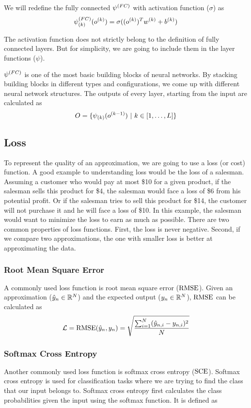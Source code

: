We will redefine the fully connected $\psi^{(FC)}$ with activation function ($\sigma$) as
$$ \psi^{(FC)}_{(k)}(o^{(k)}) = \sigma((o^{(k)})^Tw^{(k)} + b^{(k)})$$

The activation function does not strictly belong to the definition of fully connected layers. But for simplicity, we are going to include them in the layer functions ($\psi$).

$\psi^{(FC)}$ is one of the most basic building blocks of neural networks. By stacking building blocks in different types and configurations, we come up with different neural network structures. The outputs of every layer, starting from the input are calculated as
$$ \all\outputvar = \{\lfk{k}(\ok{k-1}) \ | \  k \in [1, \ldots, \num\layer] \} $$
\subsection{Loss}

To represent the quality of an approximation, we are going to use a loss (or cost) function. A good example to understanding loss would be the loss of a salesman. Assuming a customer who would pay at most \$10 for a given product, if the salesman sells this product for \$4, the salesman would face a loss of \$6 from his potential profit. Or if the salesman tries to sell this product for \$14, the customer will not purchase it and he will face a loss of \$10. In this example, the salesman would want to minimize the loss to earn as much as possible. There are two common properties of loss functions. First, the loss is never negative. Second, if we compare two approximations, the one with smaller loss is better at approximating the data.

\subsubsection{Root Mean Square Error}
A commonly used loss function is root mean square error ($\textrm{RMSE}$). Given an approximation ($\hat{y}_{n} \in \mathbb{R}^{N}$) and the expected output ($y_{n} \in \mathbb{R}^{N}$), $\textrm{RMSE}$ can be calculated as
\begin{equation*}
\mathcal{L} = \textrm{RMSE}(\hat{y}_{n}, y_{n}) = \sqrt{\frac{\sum^N_{i=1} (\hat{y}_{n,i} - y_{n,i})^2 }{N}}
\end{equation*}

\subsubsection{Softmax Cross Entropy}
Another commonly used loss function is softmax cross entropy ($\textrm{SCE}$). Softmax cross entropy is used for classification tasks where we are trying to find the class that our input belongs to. Softmax cross entropy first calculates the class probabilities given the input using the softmax function. It is defined as

